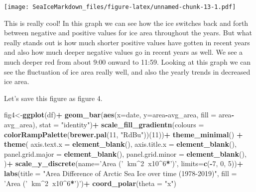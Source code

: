 \documentclass[]{article}
\newenvironment{Shaded}{\begin{snugshade}}{\end{snugshade}}
\newcommand{\KeywordTok}[1]{\textcolor[rgb]{0.13,0.29,0.53}{\textbf{#1}}}
\newcommand{\DataTypeTok}[1]{\textcolor[rgb]{0.13,0.29,0.53}{#1}}
\newcommand{\DecValTok}[1]{\textcolor[rgb]{0.00,0.00,0.81}{#1}}
\newcommand{\StringTok}[1]{\textcolor[rgb]{0.31,0.60,0.02}{#1}}
\newcommand{\OperatorTok}[1]{\textcolor[rgb]{0.81,0.36,0.00}{\textbf{#1}}}
\newcommand{\NormalTok}[1]{#1}
\begin{document}
\texttt{[image: SeaIceMarkdown\_files/figure-latex/unnamed-chunk-13-1.pdf]}

This is really cool! In this graph we can see how the ice switches back
and forth between negative and positive values for ice area throughout
the years. But what really stands out is how much shorter positive
values have gotten in recent years and also how much deeper negative
values go in recent years as well. We see a much deeper red from about
9:00 onward to 11:59. Looking at this graph we can see the fluctuation
of ice area really well, and also the yearly trends in decreased ice
area.

Let's save this figure as figure 4.

\begin{Shaded}
\begin{Highlighting}[]
\NormalTok{fig4<-}\KeywordTok{ggplot}\NormalTok{(df)}\OperatorTok{+}
\StringTok{  }\KeywordTok{geom_bar}\NormalTok{(}\KeywordTok{aes}\NormalTok{(}\DataTypeTok{x=}\NormalTok{date, }\DataTypeTok{y=}\NormalTok{area}\OperatorTok{-}\NormalTok{avg_area, }\DataTypeTok{fill =}\NormalTok{ area}\OperatorTok{-}\NormalTok{avg_area), }\DataTypeTok{stat =} \StringTok{"identity"}\NormalTok{)}\OperatorTok{+}
\StringTok{  }\KeywordTok{scale_fill_gradientn}\NormalTok{(}\DataTypeTok{colours =} \KeywordTok{colorRampPalette}\NormalTok{(}\KeywordTok{brewer.pal}\NormalTok{(}\DecValTok{11}\NormalTok{, }\StringTok{"RdBu"}\NormalTok{))(}\DecValTok{11}\NormalTok{))}\OperatorTok{+}
\StringTok{  }\KeywordTok{theme_minimal}\NormalTok{() }\OperatorTok{+}\StringTok{ }
\StringTok{  }\KeywordTok{theme}\NormalTok{(}
    \DataTypeTok{axis.text.x =} \KeywordTok{element_blank}\NormalTok{(),}
    \DataTypeTok{axis.title.x =} \KeywordTok{element_blank}\NormalTok{(),}
    \DataTypeTok{panel.grid.major =} \KeywordTok{element_blank}\NormalTok{(),}
    \DataTypeTok{panel.grid.minor =} \KeywordTok{element_blank}\NormalTok{(),}
\NormalTok{  )}\OperatorTok{+}
\StringTok{  }\KeywordTok{scale_y_discrete}\NormalTok{(}\DataTypeTok{name=}\StringTok{'Area ('}\OperatorTok{~}\NormalTok{km}\OperatorTok{^}\DecValTok{2}\OperatorTok{~}\NormalTok{x10}\OperatorTok{^}\DecValTok{6}\OperatorTok{*}\StringTok{')'}\NormalTok{, }\DataTypeTok{limits=}\KeywordTok{c}\NormalTok{(}\OperatorTok{-}\DecValTok{7}\NormalTok{, }\DecValTok{0}\NormalTok{, }\DecValTok{5}\NormalTok{))}\OperatorTok{+}
\StringTok{  }\KeywordTok{labs}\NormalTok{(}\DataTypeTok{title =} \StringTok{"Area Difference of Arctic Sea Ice over time (1978-2019)"}\NormalTok{, }\DataTypeTok{fill =} \StringTok{'Area ('}\OperatorTok{~}\NormalTok{km}\OperatorTok{^}\DecValTok{2}\OperatorTok{~}\NormalTok{x10}\OperatorTok{^}\DecValTok{6}\OperatorTok{*}\StringTok{')'}\NormalTok{)}\OperatorTok{+}
\StringTok{  }\KeywordTok{coord_polar}\NormalTok{(}\DataTypeTok{theta =} \StringTok{"x"}\NormalTok{)}
\end{Highlighting}
\end{Shaded}
\end{document}

